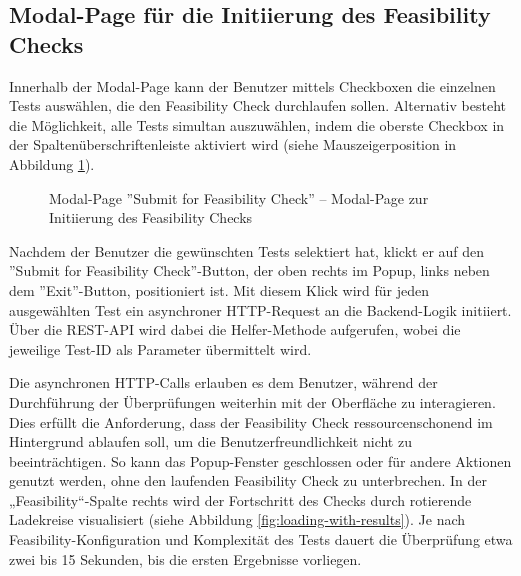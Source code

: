 \subsection{Modal-Page für die Initiierung des Feasibility Checks}

Innerhalb der Modal-Page kann der Benutzer mittels Checkboxen die einzelnen Tests auswählen, die den Feasibility Check durchlaufen sollen. Alternativ besteht die Möglichkeit, alle Tests simultan auszuwählen, indem die oberste Checkbox in der Spaltenüberschriftenleiste aktiviert wird (siehe Mauszeigerposition in Abbildung \ref{fig:submit-page}).

\begin{figure}[!htbp] 
    \centering 
    \caption{Modal-Page ''Submit for Feasibility Check'' – Modal-Page zur Initiierung des Feasibility Checks} 
    \label{fig:submit-page} 
\end{figure}

Nachdem der Benutzer die gewünschten Tests selektiert hat, klickt er auf den \linebreak ''Submit for Feasibility Check''-Button, der oben rechts im Popup, links neben dem ''Exit''-Button, positioniert ist. Mit diesem Klick wird für jeden ausgewählten Test ein asynchroner HTTP-Request an die Backend-Logik initiiert. Über die REST-API wird dabei die Helfer-Methode aufgerufen, wobei die jeweilige Test-ID als Parameter übermittelt wird.

Die asynchronen HTTP-Calls erlauben es dem Benutzer, während der Durchführung der Überprüfungen weiterhin mit der Oberfläche zu interagieren. Dies erfüllt die Anforderung, dass der Feasibility Check ressourcenschonend im Hintergrund ablaufen soll, um die Benutzerfreundlichkeit nicht zu beeinträchtigen. So kann das Popup-Fenster geschlossen oder für andere Aktionen genutzt werden, ohne den laufenden Feasibility Check zu unterbrechen. In der „Feasibility“-Spalte rechts wird der Fortschritt des Checks durch rotierende Ladekreise visualisiert (siehe Abbildung \ref{fig:loading-with-results}). Je nach Feasibility-Konfiguration und Komplexität des Tests dauert die Überprüfung etwa zwei bis 15 Sekunden, bis die ersten Ergebnisse vorliegen.

